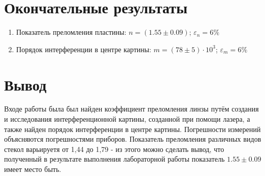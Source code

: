 \documentclass{article}
\begin{document}
\section{Окончательные результаты}
\begin{enumerate}
    \item Показатель преломления пластины: $n = (1.55 \pm 0.09 )$; $\varepsilon_{n} = 6\%$  
    \item Порядок интерференции в центре картины: $m = (78 \pm 5 )\cdot 10^{3}$; $\varepsilon_{m} = 6\%$  
\end{enumerate}
\newpage
\section{Вывод}
Входе работы была был найден коэффициент преломления линзы путём создания и исследования интерференционной картины, созданной при помощи лазера, а также найден порядок интерференции в центре картины. Погрешности измерений объясняются погрешностями приборов. Показатель преломления различных видов стекол варьируетя от 1,44 до 1,79 - из этого можно сделать вывод, что полученный в результате выполнения лабораторной работы показатель $1.55 \pm 0.09$ имеет место быть.
\end{document}
